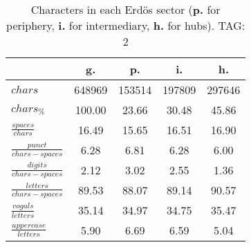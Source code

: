 \begin{table}[h!]
\begin{center}
\begin{tabular}{| l || c | c | c | c |}\hline
 & {\bf g.} & {\bf p.} & {\bf i.} & {\bf h.} \\\hline\hline
$chars$ & 648969  & 153514  & 197809  & 297646 \\
$chars_{\%}$ & 100.00  & 23.66  & 30.48  & 45.86 \\\hline
$\frac{spaces}{chars}$ & 16.49  & 15.65  & 16.51  & 16.90 \\
$\frac{punct}{chars-spaces}$ & 6.28  & 6.81  & 6.28  & 6.00 \\
$\frac{digits}{chars-spaces}$ & 2.12  & 3.02  & 2.55  & 1.36 \\\hline
$\frac{letters}{chars-spaces}$ & 89.53  & 88.07  & 89.14  & 90.57 \\
$\frac{vogals}{letters}$ & 35.14  & 34.97  & 34.75  & 35.47 \\
$\frac{uppercase}{letters}$ & 5.90  & 6.69  & 6.59  & 5.04 \\\hline
\end{tabular}
\caption{Characters in each Erd\"os sector ({{\bf p.}} for periphery, {{\bf i.}} for intermediary, 
    {{\bf h.}} for hubs). TAG: 2}
\end{center}
\end{table}